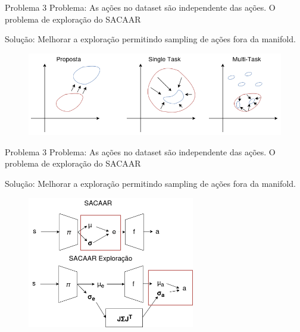 \begin{frame}{Problema 3}
    Problema: As ações no dataset são independente das ações. O problema de exploração do SACAAR

    Solução: Melhorar a exploração permitindo sampling de ações fora da manifold. 

    \begin{figure}
        \centering
        \vspace{0pt}
        \includegraphics[width=\textwidth]{img/sacaar_exp.png}
    \end{figure}
\end{frame}
\begin{frame}{Problema 3}
    Problema: As ações no dataset são independente das ações. O problema de exploração do SACAAR

    Solução: Melhorar a exploração permitindo sampling de ações fora da manifold. 

    \begin{figure}
        \centering
        \vspace{0pt}
        \includegraphics[width=0.65\textwidth]{img/sacaar_sigma.png}
    \end{figure}
\end{frame}
